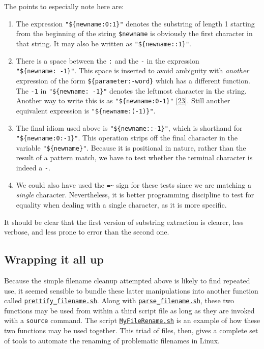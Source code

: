\documentclass[
  a4paper,
]{article}
\begin{document}
The points to especially note here are:

\begin{enumerate}
\def\labelenumi{(\alph{enumi})}
\item
  The expression \texttt{"\$\{newname:0:1\}"} denotes the substring of
  length 1 starting from the beginning of the string \texttt{\$newname}
  is obviously the first character in that string. It may also be
  written as \texttt{"\$\{newname::1\}"}.
\item
  There is a space between the \texttt{:} and the \texttt{-} in the
  expression \texttt{"\$\{newname:\ -1\}"}. This space is inserted to
  avoid ambiguity with \emph{another} expression of the form
  \texttt{\$\{parameter:-word\}} which has a different function. The
  \texttt{-1} in \texttt{"\$\{newname:\ -1\}"} denotes the leftmost
  character in the string. Another way to write this is as
  \texttt{"\$\{newname:0-1\}"}
  \protect\hyperlink{ref-lastchar}{{[}23{]}}. Still another equivalent
  expression is \texttt{"\$\{newname:(-1)\}"}.
\item
  The final idiom used above is \texttt{"\$\{newname::-1\}"}, which is
  shorthand for \texttt{"\$\{newname:0:-1\}"}. This operation strips off
  the final character in the variable \texttt{"\$\{newname\}"}. Because
  it is positional in nature, rather than the result of a pattern match,
  we have to test whether the terminal character is indeed a \texttt{-}.
\item
  We could also have used the \texttt{=\textasciitilde{}} sign for these
  tests since we are matching a \emph{single} character. Nevertheless,
  it is better programming discipline to test for equality when dealing
  with a single character, as it is more specific.
\end{enumerate}

It should be clear that the first version of substring extraction is
clearer, less verbose, and less prone to error than the second one.

\hypertarget{wrapping-it-all-up}{%
\subsection{Wrapping it all up}\label{wrapping-it-all-up}}

Because the simple filename cleanup attempted above is likely to find
repeated use, it seemed sensible to bundle these latter manipulations
into another function called
\href{scripts/prettify_filename.sh}{\texttt{prettify\_filename.sh}}.
Along with
\href{scripts/parse_filename.sh}{\texttt{parse\_filename.sh}}, these two
functions may be used from within a third script file as long as they
are invoked with a \texttt{source} command. The script
\href{scripts/MyFileRename.sh}{\texttt{MyFileRename.sh}} is an example
of how these two functions may be used together. This triad of files,
then, gives a complete set of tools to automate the renaming of
problematic filenames in Linux.
\end{document}

